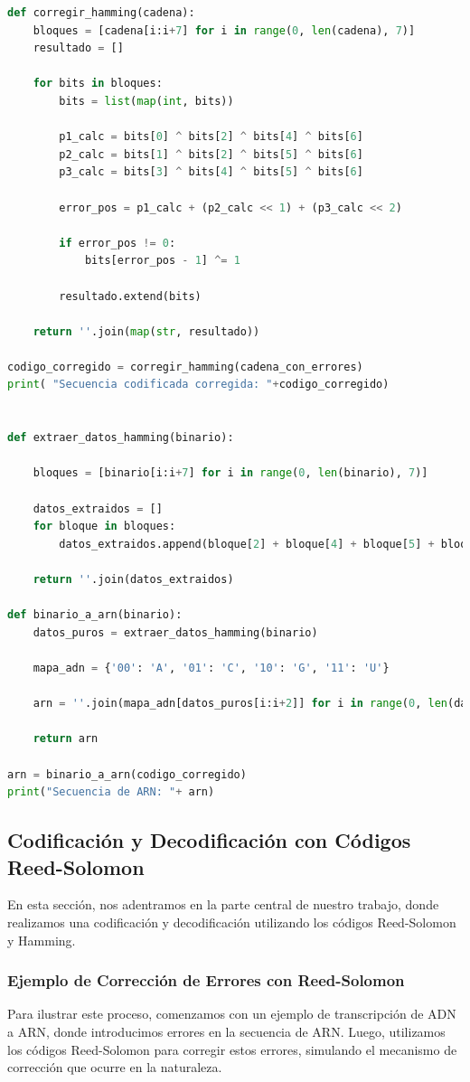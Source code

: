 \begin{lstlisting}[language=Python]
def corregir_hamming(cadena):
    bloques = [cadena[i:i+7] for i in range(0, len(cadena), 7)]
    resultado = []

    for bits in bloques:
        bits = list(map(int, bits))

        p1_calc = bits[0] ^ bits[2] ^ bits[4] ^ bits[6]
        p2_calc = bits[1] ^ bits[2] ^ bits[5] ^ bits[6]
        p3_calc = bits[3] ^ bits[4] ^ bits[5] ^ bits[6]

        error_pos = p1_calc + (p2_calc << 1) + (p3_calc << 2)

        if error_pos != 0:
            bits[error_pos - 1] ^= 1

        resultado.extend(bits)

    return ''.join(map(str, resultado))

codigo_corregido = corregir_hamming(cadena_con_errores)
print( "Secuencia codificada corregida: "+codigo_corregido)


def extraer_datos_hamming(binario):

    bloques = [binario[i:i+7] for i in range(0, len(binario), 7)]

    datos_extraidos = []
    for bloque in bloques:
        datos_extraidos.append(bloque[2] + bloque[4] + bloque[5] + bloque[6])

    return ''.join(datos_extraidos)

def binario_a_arn(binario):
    datos_puros = extraer_datos_hamming(binario)

    mapa_adn = {'00': 'A', '01': 'C', '10': 'G', '11': 'U'}

    arn = ''.join(mapa_adn[datos_puros[i:i+2]] for i in range(0, len(datos_puros), 2))

    return arn

arn = binario_a_arn(codigo_corregido)
print("Secuencia de ARN: "+ arn)
\end{lstlisting}




\subsection{Codificación y Decodificación con Códigos Reed-Solomon }

En esta sección, nos adentramos en la parte central de nuestro trabajo, donde realizamos una codificación y decodificación utilizando los códigos Reed-Solomon y Hamming.

\subsubsection{Ejemplo de Corrección de Errores con Reed-Solomon}
Para ilustrar este proceso, comenzamos con un ejemplo de transcripción de ADN a ARN, donde introducimos errores en la secuencia de ARN. Luego, utilizamos los códigos Reed-Solomon para corregir estos errores, simulando el mecanismo de corrección que ocurre en la naturaleza.

